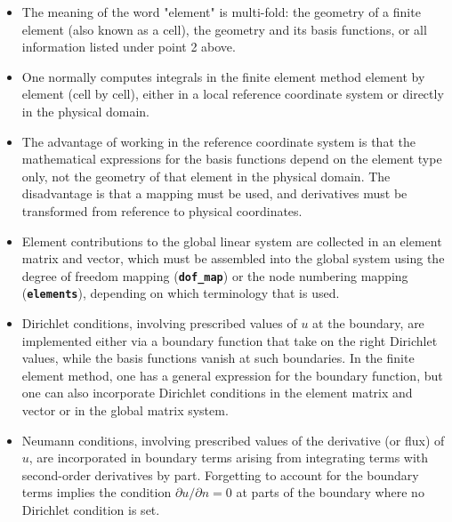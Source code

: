 \documentclass[../main.tex]{subfiles}
\begin{document}
\begin{itemize}
\begin{enumerate}
		\end{enumerate}
	\item The meaning of the word "element" is multi-fold: the geometry of a finite element (also known as a cell), the geometry and its basis functions, or all information listed under point 2 above.
	\item One normally computes integrals in the finite element method element by element (cell by cell), either in a local reference coordinate system or directly in the physical domain.
	\item The advantage of working in the reference coordinate system is that the mathematical expressions for the basis functions depend on the element type only, not the geometry of that element in the physical domain. The disadvantage is that a mapping must be used, and derivatives must be transformed from reference to physical coordinates.
	\item Element contributions to the global linear system are collected in an element matrix and vector, which must be assembled into the global system using the degree of freedom mapping (\textbf{\texttt{dof\_map}}) or the node numbering mapping (\textbf{\texttt{elements}}), depending on which terminology that is used.
	\item Dirichlet conditions, involving prescribed values of $u$ at the boundary, are implemented either via a boundary function that take on the right Dirichlet values, while the basis functions vanish at such boundaries. In the finite element method, one has a general expression for the boundary function, but one can also incorporate Dirichlet conditions in the element matrix and vector or in the global matrix system.
	\item Neumann conditions, involving prescribed values of the derivative (or flux) of $u$, are incorporated in boundary terms arising from integrating terms with second-order derivatives by part. Forgetting to account for the boundary terms implies the condition $\partial u / \partial n=0$ at parts of the boundary where no Dirichlet condition is set.
\end{itemize}
\clearpage
\end{document}
